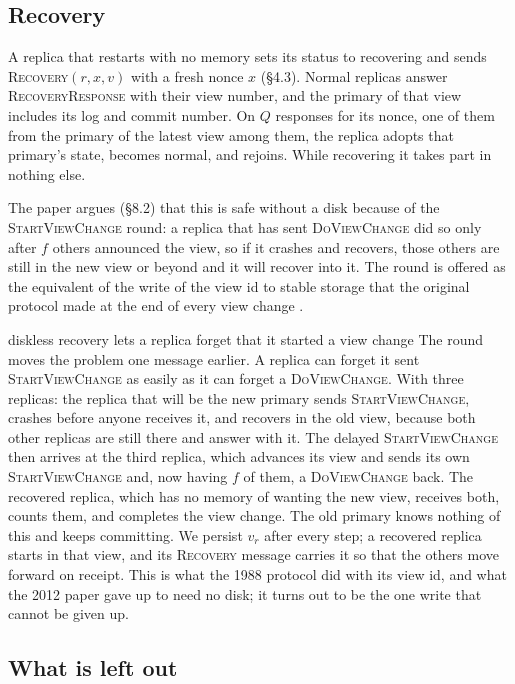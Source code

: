 \documentclass[11pt,a4paper]{article}
\theoremstyle{plain}
\theoremstyle{definition}
\theoremstyle{remark}
\newcommand{\msg}[1]{\textsc{#1}}
\begin{document}
\subsection{Recovery}
\label{app:recovery}

A replica that restarts with no memory sets its status to recovering and
sends \msg{Recovery}$(r, x, v)$ with a fresh nonce $x$ (\S4.3). Normal
replicas answer \msg{RecoveryResponse} with their view number, and the
primary of that view includes its log and commit number. On $Q$
responses for its nonce, one of them from the primary of the latest view
among them, the replica adopts that primary's state, becomes normal, and
rejoins. While recovering it takes part in nothing else.

The paper argues (\S8.2) that this is safe without a disk because of the
\msg{StartViewChange} round: a replica that has sent \msg{DoViewChange}
did so only after $f$ others announced the view, so if it crashes and
recovers, those others are still in the new view or beyond and it will
recover into it. The round is offered as the equivalent of the write of
the view id to stable storage that the original protocol made at the end
of every view change \citep[\S4]{oki1988vr}.

\begin{departure}{diskless recovery lets a replica forget that it started a view change}
The round moves the
problem one message earlier. A replica can forget it sent
\msg{StartViewChange} as easily as it can forget a \msg{DoViewChange}.
With three replicas: the replica that will be the new primary sends
\msg{StartViewChange}, crashes before anyone receives it, and recovers in
the old view, because both other replicas are still there and answer
with it. The delayed \msg{StartViewChange} then arrives at the third
replica, which advances its view and sends its own \msg{StartViewChange}
and, now having $f$ of them, a \msg{DoViewChange} back. The recovered
replica, which has no memory of wanting the new view, receives both,
counts them, and completes the view change. The old primary knows nothing
of this and keeps committing. We persist $v_r$ after every step; a
recovered replica starts in that view, and its
\msg{Recovery} message carries it so that the others move forward on
receipt. This is what the 1988 protocol did with its view id, and what
the 2012 paper gave up to need no disk; it turns out to be the one write
that cannot be given up.
\end{departure}

\subsection{What is left out}
\end{document}
